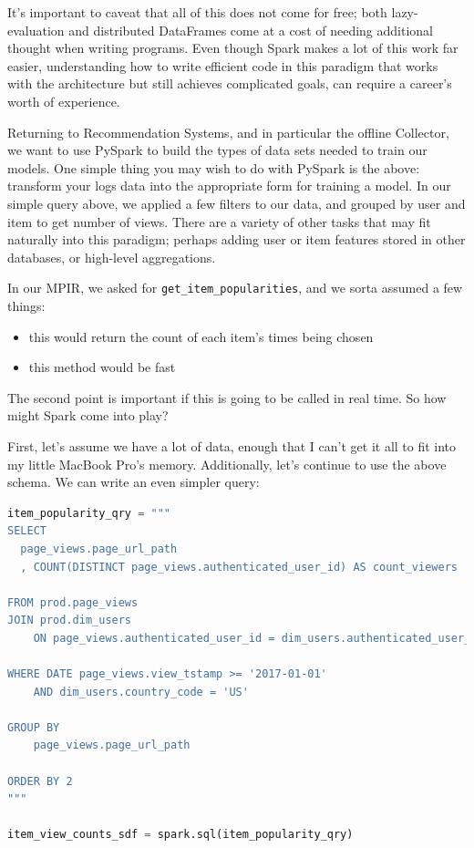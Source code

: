 It's important to caveat that all of this does not come for free; both lazy-evaluation and distributed DataFrames come at a cost of needing additional thought when writing programs. Even though Spark makes a lot of this work far easier, understanding how to write efficient code in this paradigm that works with the architecture but still achieves complicated goals, can require a career's worth of experience. 

Returning to Recommendation Systems, and in particular the offline Collector, we want to use PySpark to build the types of data sets needed to train our models. One simple thing you may wish to do with PySpark is the above: transform your logs data into the appropriate form for training a model. In our simple query above, we applied a few filters to our data, and grouped by user and item to get number of views. There are a variety of other tasks that may fit naturally into this paradigm; perhaps adding user or item features stored in other databases, or high-level aggregations.

In our MPIR, we asked for \lstinline{get_item_popularities}, and we sorta assumed a few things:

\begin{itemize}
\item this would return the count of each item's times being chosen
\item this method would be fast
\end{itemize}

The second point is important if this is going to be called in real time. So how might Spark come into play?

First, let's assume we have a lot of data, enough that I can't get it all to fit into my little MacBook Pro's memory. Additionally, let's continue to use the above schema. We can write an even simpler query:

\begin{lstlisting}[language=Python]
item_popularity_qry = """
SELECT 
  page_views.page_url_path
  , COUNT(DISTINCT page_views.authenticated_user_id) AS count_viewers 

FROM prod.page_views
JOIN prod.dim_users 
	ON page_views.authenticated_user_id = dim_users.authenticated_user_id 

WHERE DATE page_views.view_tstamp >= '2017-01-01'
	AND dim_users.country_code = 'US'

GROUP BY 
	page_views.page_url_path

ORDER BY 2
"""

item_view_counts_sdf = spark.sql(item_popularity_qry)
\end{lstlisting}


